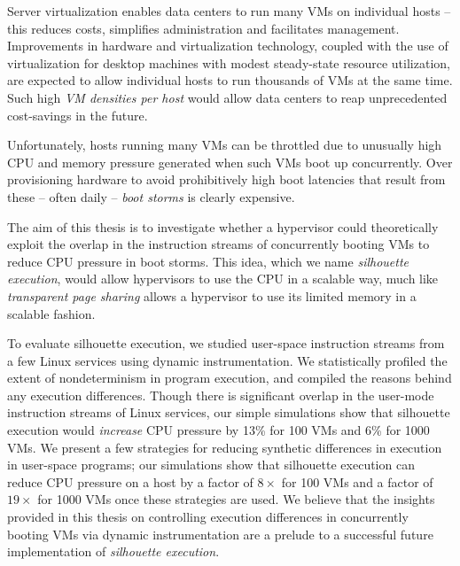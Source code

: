 % 
% 
%
Server virtualization enables data centers to run many VMs on individual hosts -- 
this reduces costs, simplifies administration and facilitates management.
Improvements in hardware and virtualization technology,
coupled with the use of virtualization for desktop machines with modest 
steady-state resource utilization, are expected to allow
individual hosts to run thousands of VMs at the same time.
Such high {\em VM densities per host} would allow data centers
to reap unprecedented cost-savings in the future.

Unfortunately, hosts running many VMs 
can be throttled due to unusually high CPU and
memory pressure generated when such VMs 
boot up concurrently. Over provisioning hardware
to avoid prohibitively high boot latencies that result from
these -- often daily -- {\em boot storms} 
is clearly expensive.

The aim of this thesis is to investigate whether a hypervisor could theoretically exploit the overlap in 
the instruction streams of concurrently booting VMs to reduce CPU pressure in boot storms. 
This idea, which we name {\em silhouette execution}, would allow hypervisors
to use the CPU in a scalable way, much like {\em transparent page sharing}
allows a hypervisor to use its limited memory in a scalable fashion.

To evaluate silhouette execution, we studied user-space
instruction streams from a few Linux services using dynamic instrumentation.
We statistically profiled the extent of nondeterminism in program execution, and   
compiled the reasons behind any execution differences.
Though there is significant overlap in the user-mode instruction streams
of Linux services, our simple simulations show that silhouette
execution would {\em increase} CPU pressure by 13\% for 100 VMs and 6\% for 1000 VMs.
We present a few strategies for reducing synthetic differences in execution in user-space
programs; our simulations show that silhouette execution can reduce CPU pressure on a host by a factor
of $8\times$ for 100 VMs and a factor of $19\times$ for 1000
VMs once these strategies are used. We believe that the insights provided in this thesis on controlling
execution differences in concurrently booting VMs via
dynamic instrumentation are a prelude to a successful future implementation of {\em silhouette execution}.




